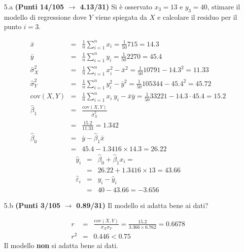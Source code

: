 \documentclass[
  11pt,
]{book}
\theoremstyle{mytheoremstyle}
\theoremstyle{mydefstyle}
\newenvironment{sol}
  {
  \begin{tcolorbox}[enhanced,breakable,arc=0.1mm,boxrule=1pt,colback=white,colframe=iblue,
  title=\bf \fontfamily{lmss}\selectfont \hspace{.5 cm} Soluzione,drop fuzzy shadow]

}{
\end{tcolorbox}
  }
\begin{document}
5.a \textbf{(Punti 14/105 \(\rightarrow\) 4.13/31)} Si è osservato \(x_3=13\) e \(y_3=40\), stimare il modello di regressione dove \(Y\) viene spiegata da \(X\) e calcolare il residuo per il punto \(i=3\).

\begin{sol}
\begin{eqnarray*}
           \bar x &=&\frac 1 n\sum_{i=1}^n x_i = \frac {1}{ 50 }  715 =  14.3 \\
           \bar y &=&\frac 1 n\sum_{i=1}^n y_i = \frac {1}{ 50 }  2270 =  45.4 \\
           \hat\sigma_X^2&=&\frac 1 n\sum_{i=1}^n x_i^2-\bar x^2=\frac {1}{ 50 }  10791  - 14.3 ^2= 11.33 \\
           \hat\sigma_Y^2&=&\frac 1 n\sum_{i=1}^n y_i^2-\bar y^2=\frac {1}{ 50 }  105344  - 45.4 ^2= 45.72 \\
           \text{cov}(X,Y)&=&\frac 1 n\sum_{i=1}^n x_i~y_i-\bar x\bar y=\frac {1}{ 50 }  33221 - 14.3 \cdot 45.4 = 15.2 \\
           \hat\beta_1 &=& \frac{\text{cov}(X,Y)}{\hat\sigma_X^2} \\
                    &=& \frac{ 15.2 }{ 11.33 }  =  1.342 \\
           \hat\beta_0 &=& \bar y - \hat\beta_1 \bar x\\
                    &=&  45.4 - 1.3416 \times  14.3 = 26.22 
         \end{eqnarray*}\begin{eqnarray*}
\hat y_i &=&\hat\beta_0+\hat\beta_1 x_i=\\ 
&=& 26.22 + 1.3416 \times 13 = 43.66 \\ 
\hat \varepsilon_i &=& y_i-\hat y_i\\ 
&=& 40 - 43.66 = -3.656  
\end{eqnarray*}

\end{sol}

5.b \textbf{(Punti 3/105 \(\rightarrow\) 0.89/31)} Il modello si adatta bene ai dati?

\begin{sol}
\begin{eqnarray*}
r&=&\frac{\text{cov}(X,Y)}{\sigma_X\sigma_Y}=\frac{ 15.2 }{ 3.366 \times 6.762 }= 0.6678 \\r^2&=& 0.446 < 0.75
\end{eqnarray*}
Il modello \textbf{non} si adatta bene ai dati.

\end{sol}
\end{document}
